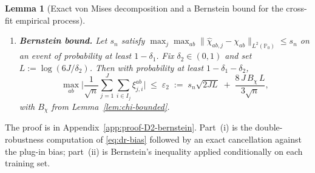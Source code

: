 \documentclass[11pt]{article}
\theoremstyle{plain}
\newtheorem{lemma}[theorem]{Lemma}
\theoremstyle{definition}
\theoremstyle{remark}
\newcommand{\E}{\mathbb{E}}
\newcommand{\PP}{\mathbb{P}}
\begin{document}
\begin{lemma}[Exact von Mises decomposition and a Bernstein bound for the cross-fit
empirical process]
\begin{enumerate}[label=(\roman*)]
\begin{equation}
        \hat\Theta^{(j)}_{ab}-\Theta_{ab}\;=\;\frac{J}{n}\sum_{i\in I_j}\chi_{ab}(O_i)\;+\;\frac{J}{n}\sum_{i\in I_j}\xi^{ab}_{j,i}\;+\;R^{(j)}_{ab},
    \end{equation}
    where the centered empirical-process summands and the exact remainder are
    \begin{align}
        \xi^{ab}_{j,i}&:=\big(\hat\chi_{ab,j}-\chi_{ab}\big)(O_i)\;-\;\E_{\PP_0}\big[\hat\chi_{ab,j}(O)-\chi_{ab}(O)\,\big|\,\mathcal T_j\big],\label{eq:xi-def}\\
        R^{(j)}_{ab}&:=-\,\delta_{a,j}^\top\Sigma\,\delta_{b,j}\;+\;(\Sigma\hat\tau_{b,j})^\top\Delta^{\mathrm{dr}}_{a,j}\;+\;(\Sigma\hat\tau_{a,j})^\top\Delta^{\mathrm{dr}}_{b,j}.\label{eq:R-exact}
    \end{align}
    Every term of \eqref{eq:R-exact} is a product of two nuisance errors;
    \eqref{eq:R-exact} is \eqref{eq:remainder} specialized to the interior regime, up to
    the sign convention (this document's \eqref{eq:remainder} carries the opposite sign
    on the leading term; since \eqref{eq:CS-remainder} is a modulus bound, this does not
    affect anything downstream). Its leading term
    $-\delta_{a,j}^\top\Sigma\,\delta_{b,j}$ obeys the Cauchy--Schwarz bound
    \eqref{eq:CS-remainder}; the two double-robustness terms carry a different error
    product and are bounded separately, in Step~3 of the proof of
    Theorem~\ref{thm:finite-n} (Appendix~\ref{app:proof-finite-n}).
    \item \textbf{Bernstein bound.} Let $s_n$ satisfy
    $\max_j\max_{ab}\|\hat\chi_{ab,j}-\chi_{ab}\|_{L^2(\PP_0)}\le s_n$ on an event of
    probability at least $1-\delta_1$. Fix $\delta_2\in(0,1)$ and set
    $L:=\log(6J/\delta_2)$. Then with probability at least $1-\delta_1-\delta_2$,
    \begin{equation}\label{eq:eps2}
        \max_{ab}\Big|\frac{1}{\sqrt n}\sum_{j=1}^J\sum_{i\in I_j}\xi^{ab}_{j,i}\Big|
        \;\le\;\varepsilon_2\;:=\;s_n\sqrt{2JL}\;+\;\frac{8\,J\,B_\chi\,L}{3\sqrt n},
    \end{equation}
    with $B_\chi$ from Lemma~\ref{lem:chi-bounded}.
\end{enumerate}
\end{lemma}

The proof is in Appendix~\ref{app:proof-D2-bernstein}. Part~(i) is the double-robustness
computation of \eqref{eq:dr-bias} followed by an exact cancellation against the plug-in
bias; part~(ii) is Bernstein's inequality applied conditionally on each training set.
\end{document}
